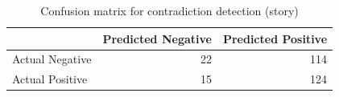 \begin{table}
\caption{Confusion matrix for contradiction detection (story)}
\label{tab:confusion_matrix}
\begin{tabular}{lrr}
\toprule
 & Predicted Negative & Predicted Positive \\
\midrule
Actual Negative & 22 & 114 \\
Actual Positive & 15 & 124 \\
\bottomrule
\end{tabular}
\end{table}
